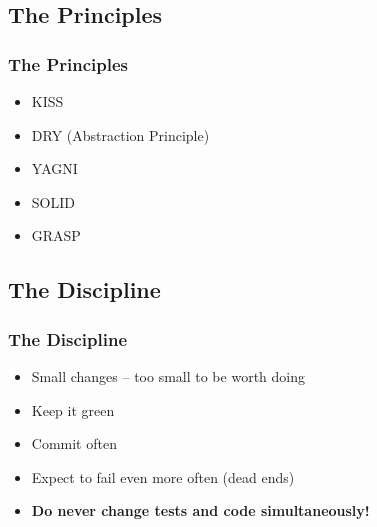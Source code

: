 \documentclass[english]{beamer}
\begin{document}
\subsection{The Principles}

\begin{frame}
\frametitle{The Principles}
\begin{itemize}[<+->]
\item KISS 
\item DRY (Abstraction Principle)
\item YAGNI
\item SOLID
\item GRASP
\end{itemize}
\end{frame}

\subsection{The Discipline}

\begin{frame}
\frametitle{The Discipline}
\begin{itemize}[<+->]
\item Small changes -- too small to be worth doing
\item Keep it green
\item Commit often
\item Expect to fail even more often (dead ends)
\item \textbf{Do never change tests and code simultaneously!}
\end{itemize}
\end{frame}
\end{document}
